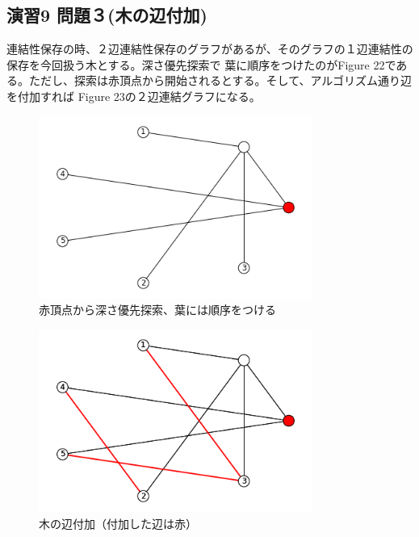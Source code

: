 \documentclass{report}
\begin{document}
\begin{CJK}{UTF8}{min}
    \section*{演習9 問題３(木の辺付加)}
    連結性保存の時、２辺連結性保存のグラフがあるが、そのグラフの１辺連結性の保存を今回扱う木とする。深さ優先探索で
    葉に順序をつけたのがFigure 22である。ただし、探索は赤頂点から開始されるとする。そして、アルゴリズム通り辺を付加すれば
    Figure 23の２辺連結グラフになる。
    \begin{figure}[!h]
        \centerline{\includegraphics[width=0.8\textwidth]{data/ex9-def.png}}
        \caption{赤頂点から深さ優先探索、葉には順序をつける}
    \end{figure}
    \begin{figure}[!h]
        \centerline{\includegraphics[width=0.8\textwidth]{data/ex9-T.png}}
        \caption{木の辺付加（付加した辺は赤）}
    \end{figure}


    \clearpage

\end{CJK}
\end{document}
